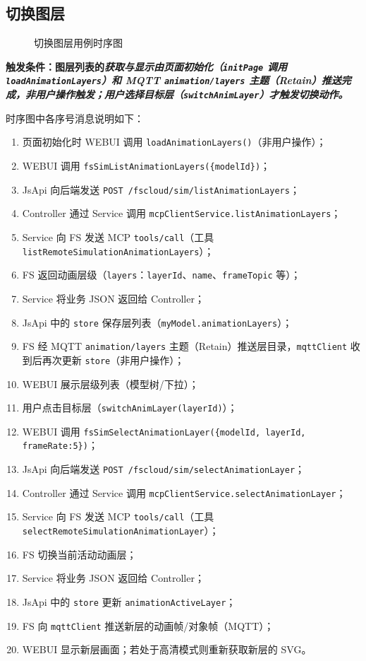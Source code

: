 \newpage
\subsection{切换图层}
\begin{figure}[!h]
	\centering
	\resizebox{1.0\linewidth}{!}{}
	\caption{切换图层用例时序图}\label{fig:switchLayer}
\end{figure}
\bf{触发条件}：图层列表的\it{获取与显示}由页面初始化（\texttt{initPage} 调用 \texttt{loadAnimationLayers}）和 MQTT \texttt{animation/layers} 主题（Retain）推送完成，\bf{非用户操作触发}；用户选择目标层（\texttt{switchAnimLayer}）才触发切换动作。\par 时序图中各序号消息说明如下：
\begin{enumerate}[label=\arabic*)]
	\item 页面初始化时 WEBUI 调用 \texttt{loadAnimationLayers()}（非用户操作）；
	\item WEBUI 调用 \texttt{fsSimListAnimationLayers(\{modelId\})}；
	\item JsApi 向后端发送 \texttt{POST /fscloud/sim/listAnimationLayers}；
	\item Controller 通过 Service 调用 \texttt{mcpClientService.listAnimationLayers}；
	\item Service 向 FS 发送 MCP \texttt{tools/call}（工具 \texttt{listRemoteSimulationAnimationLayers}）；
	\item FS 返回动画层级（\texttt{layers}：\texttt{layerId}、\texttt{name}、\texttt{frameTopic} 等）；
	\item Service 将业务 JSON 返回给 Controller；
	\item JsApi 中的 \texttt{store} 保存层列表（\texttt{myModel.animationLayers}）；
	\item FS 经 MQTT \texttt{animation/layers} 主题（Retain）推送层目录，\texttt{mqttClient} 收到后再次更新 \texttt{store}（非用户操作）；
	\item WEBUI 展示层级列表（模型树/下拉）；
	\item 用户点击目标层（\texttt{switchAnimLayer(layerId)}）；
	\item WEBUI 调用 \texttt{fsSimSelectAnimationLayer(\{modelId, layerId, frameRate:5\})}；
	\item JsApi 向后端发送 \texttt{POST /fscloud/sim/selectAnimationLayer}；
	\item Controller 通过 Service 调用 \texttt{mcpClientService.selectAnimationLayer}；
	\item Service 向 FS 发送 MCP \texttt{tools/call}（工具 \texttt{selectRemoteSimulationAnimationLayer}）；
	\item FS 切换当前活动动画层；
	\item Service 将业务 JSON 返回给 Controller；
	\item JsApi 中的 \texttt{store} 更新 \texttt{animationActiveLayer}；
	\item FS 向 \texttt{mqttClient} 推送新层的动画帧/对象帧（MQTT）；
	\item WEBUI 显示新层画面；若处于高清模式则重新获取新层的 SVG。
\end{enumerate}

